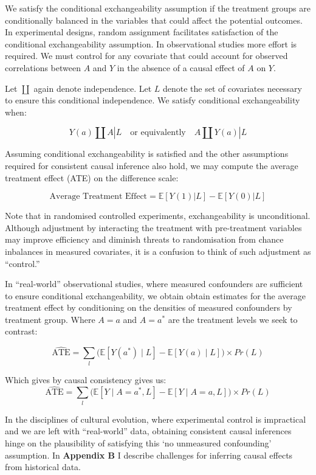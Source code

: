 \documentclass[
  single column]{article}
\begin{document}
We satisfy the conditional exchangeability assumption if the treatment
groups are conditionally balanced in the variables that could affect the
potential outcomes. In experimental designs, random assignment
facilitates satisfaction of the conditional exchangeability assumption.
In observational studies more effort is required. We must control for
any covariate that could account for observed correlations between \(A\)
and \(Y\) in the absence of a causal effect of \(A\) on \(Y\).

Let \(\coprod\) again denote independence. Let \(L\) denote the set of
covariates necessary to ensure this conditional independence. We satisfy
conditional exchangeability when:

\[
Y(a) \coprod A | L \quad \text{or equivalently} \quad A \coprod Y(a) | L
\]

Assuming conditional exchangeability is satisfied and the other
assumptions required for consistent causal inference also hold, we may
compute the average treatment effect (ATE) on the difference scale:

\[
\text{Average Treatment Effect} = \mathbb{E}[Y(1) | L] - \mathbb{E}[Y(0) | L]
\]

Note that in randomised controlled experiments, exchangeability is
unconditional. Although adjustment by interacting the treatment with
pre-treatment variables may improve efficiency and diminish threats to
randomisation from chance inbalances in measured covariates, it is a
confusion to think of such adjustment as ``control.''

In ``real-world'' observational studies, where measured confounders are
sufficient to ensure conditional exchangeability, we obtain obtain
estimates for the average treatment effect by conditioning on the
densities of measured confounders by treatment group. Where \(A=a\) and
\(A = a^*\) are the treatment levels we seek to contrast:

\[
\widehat{\text{ATE}} =  \sum_l \big( \mathbb{E}[Y(a^*) \mid L] - \mathbb{E}[Y(a) \mid L] \big) \times Pr(L)
\]

Which gives by causal consistency gives us: \[
\widehat{\text{ATE}} =  \sum_l \big( \mathbb{E}[Y \mid A = a^*, L] - \mathbb{E}[Y \mid A = a, L] \big) \times Pr(L)
\]

In the disciplines of cultural evolution, where experimental control is
impractical and we are left with ``real-world'' data, obtaining
consistent causal inferences hinge on the plausibility of satisfying
this `no unmeasured confounding' assumption. In \textbf{Appendix B} I
describe challenges for inferring causal effects from historical data.
\end{document}
